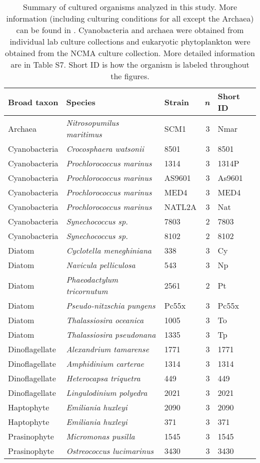 \begin{table}[ht]
\centering
\begin{tabular}{lllrl}
  \hline
Broad taxon & Species & Strain & \textit{n} & Short ID \\ 
  \hline
Archaea & \textit{Nitrosopumilus maritimus} & SCM1 &   3 & Nmar \\ 
  Cyanobacteria & \textit{Crocosphaera watsonii} & 8501 &   3 & 8501 \\ 
  Cyanobacteria & \textit{Prochlorococcus marinus} & 1314 &   3 & 1314P \\ 
  Cyanobacteria & \textit{Prochlorococcus marinus} & AS9601 &   3 & As9601 \\ 
  Cyanobacteria & \textit{Prochlorococcus marinus} & MED4 &   3 & MED4 \\ 
  Cyanobacteria & \textit{Prochlorococcus marinus} & NATL2A &   3 & Nat \\ 
  Cyanobacteria & \textit{Synechococcus sp.} & 7803 &   2 & 7803 \\ 
  Cyanobacteria & \textit{Synechococcus sp.} & 8102 &   2 & 8102 \\ 
  Diatom & \textit{Cyclotella meneghiniana} & 338 &   3 & Cy \\ 
  Diatom & \textit{Navicula pelliculosa} & 543 &   3 & Np \\ 
  Diatom & \textit{Phaeodactylum tricornutum} & 2561 &   2 & Pt \\ 
  Diatom & \textit{Pseudo-nitzschia pungens} & Pc55x &   3 & Pc55x \\ 
  Diatom & \textit{Thalassiosira oceanica} & 1005 &   3 & To \\ 
  Diatom & \textit{Thalassiosira pseudonana} & 1335 &   3 & Tp \\ 
  Dinoflagellate & \textit{Alexandrium tamarense} & 1771 &   3 & 1771 \\ 
  Dinoflagellate & \textit{Amphidinium carterae} & 1314 &   3 & 1314 \\ 
  Dinoflagellate & \textit{Heterocapsa triquetra} & 449 &   3 & 449 \\ 
  Dinoflagellate & \textit{Lingulodinium polyedra} & 2021 &   3 & 2021 \\ 
  Haptophyte & \textit{Emiliania huxleyi} & 2090 &   3 & 2090 \\ 
  Haptophyte & \textit{Emiliania huxleyi} & 371 &   3 & 371 \\ 
  Prasinophyte & \textit{Micromonas pusilla} & 1545 &   3 & 1545 \\ 
  Prasinophyte & \textit{Ostreococcus lucimarinus} & 3430 &   3 & 3430 \\ 
   \hline
\end{tabular}
\caption{\label{CultureSampleDescriptions}Summary of cultured organisms analyzed in this study. More information (including culturing conditions for all except the Archaea) can be found in \cite{Durham2019}. Cyanobacteria and archaea were obtained from individual lab culture collections and eukaryotic phytoplankton were obtained from the NCMA culture collection. More detailed information are in Table S7. Short ID is how the organism is labeled throughout the figures.} 
\end{table}
